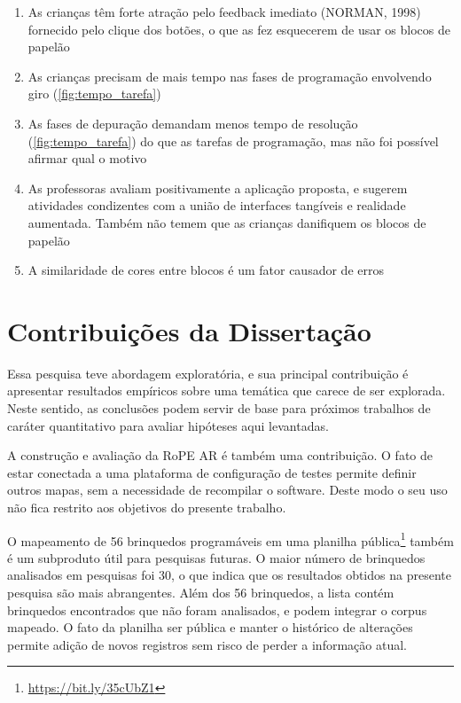 \begin{enumerate}
    \item As crianças têm forte atração pelo feedback imediato (NORMAN, 1998) fornecido pelo clique dos botões, o que as fez esquecerem de usar os blocos de papelão
    \item As crianças precisam de mais tempo nas fases de programação envolvendo giro (\autoref{fig:tempo_tarefa})
    \item As fases de depuração demandam menos tempo de resolução (\autoref{fig:tempo_tarefa}) do que as tarefas de programação, mas não foi possível afirmar qual o motivo
    \item As professoras avaliam positivamente a aplicação proposta, e sugerem atividades condizentes com a união de interfaces tangíveis e realidade aumentada. Também não temem que as crianças danifiquem os blocos de papelão
    \item A similaridade de cores entre blocos é um fator causador de erros
\end{enumerate}

\section{Contribuições da Dissertação}
\label{c_conclusao-contribuicao}

Essa pesquisa teve abordagem exploratória, e sua principal contribuição é apresentar resultados empíricos sobre uma temática que carece de ser explorada. Neste sentido, as conclusões podem servir de base para próximos trabalhos de caráter quantitativo para avaliar hipóteses aqui levantadas.

A construção e avaliação da RoPE AR é também uma contribuição. O fato de estar conectada a uma plataforma de configuração de testes permite definir outros mapas, sem a necessidade de recompilar o software. Deste modo o seu uso não fica restrito aos objetivos do presente trabalho.

O mapeamento de 56 brinquedos programáveis em uma planilha pública\footnote{\url{https://bit.ly/35cUbZ1}} também é um subproduto útil para pesquisas futuras. O maior número de brinquedos analisados em pesquisas \cite{hamilton_emerging_2020,yu_review_2019} foi 30, o que indica que os resultados obtidos na presente pesquisa são mais abrangentes. Além dos 56 brinquedos, a lista contém brinquedos encontrados que não foram analisados, e podem integrar o corpus mapeado. O fato da planilha ser pública e manter o histórico de alterações permite adição de novos registros sem risco de perder a informação atual.

